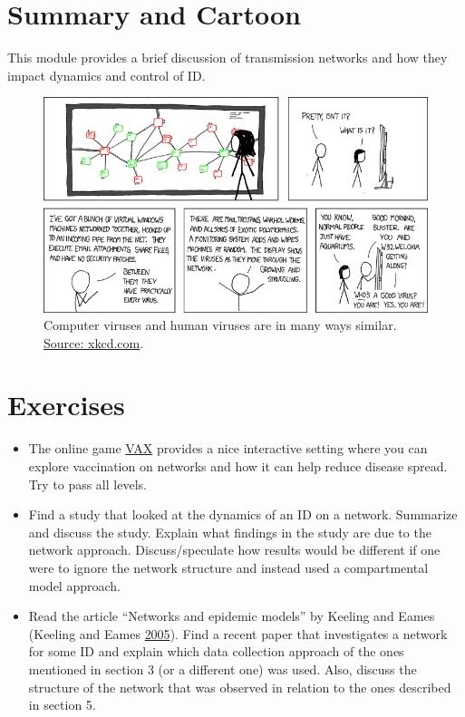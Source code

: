 \documentclass[]{book}
\providecommand{\tightlist}{%
  \setlength{\itemsep}{0pt}\setlength{\parskip}{0pt}}
\theoremstyle{definition}
\theoremstyle{definition}
\theoremstyle{definition}
\theoremstyle{remark}
\begin{document}
\section{Summary and Cartoon}\label{summary-and-cartoon-15}

This module provides a brief discussion of transmission networks and how
they impact dynamics and control of ID.

\begin{figure}
\centering
\includegraphics{./images/xkcd-network.png}
\caption{\label{fig:xkcdnetwork}Computer viruses and human viruses are in
many ways similar. \href{https://xkcd.com/350/}{Source: xkcd.com}.}
\end{figure}

\section{Exercises}\label{exercises-15}

\begin{itemize}
\tightlist
\item
  The online game \href{http://vax.herokuapp.com/}{VAX} provides a nice
  interactive setting where you can explore vaccination on networks and
  how it can help reduce disease spread. Try to pass all levels.
\item
  Find a study that looked at the dynamics of an ID on a network.
  Summarize and discuss the study. Explain what findings in the study
  are due to the network approach. Discuss/speculate how results would
  be different if one were to ignore the network structure and instead
  used a compartmental model approach.
\item
  Read the article ``Networks and epidemic models'' by Keeling and Eames
  (Keeling and Eames \protect\hyperlink{ref-keeling05}{2005}). Find a
  recent paper that investigates a network for some ID and explain which
  data collection approach of the ones mentioned in section 3 (or a
  different one) was used. Also, discuss the structure of the network
  that was observed in relation to the ones described in section 5.
\end{itemize}
\end{document}
